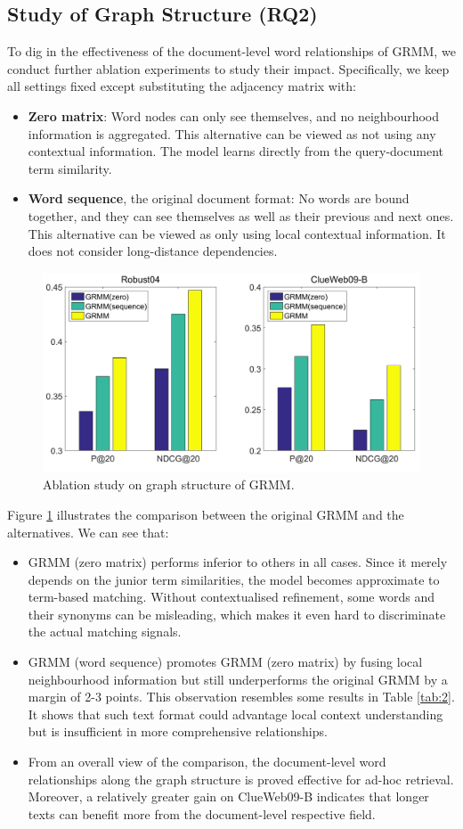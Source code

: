 \subsection{Study of Graph Structure (RQ2)}
\label{sec:graphstructure}
To dig in the effectiveness of the document-level word relationships of GRMM, we conduct further ablation experiments to study their impact. Specifically, we keep all settings fixed except substituting the adjacency matrix with: 
\begin{itemize}
	\item \textbf{Zero matrix}: Word nodes can only see themselves, and no neighbourhood information is aggregated. This alternative can be viewed as not using any contextual information. The model learns directly from the query-document term similarity.
	\item \textbf{Word sequence}, the original document format: No words are bound together, and they can see themselves as well as their previous and next ones. This alternative can be viewed as only using local contextual information. It does not consider long-distance dependencies. 
\end{itemize}


\begin{figure}[h]
	\centering
	\includegraphics[width=.47\textwidth]{./pics/graph_ablation.png}
	\caption{Ablation study on graph structure of GRMM.}
	\label{fig:3} 
\end{figure}

Figure \ref{fig:3} illustrates the comparison between the original GRMM and the alternatives. We can see that:
\begin{itemize}
    \item GRMM (zero matrix) performs inferior to others in all cases. Since it merely depends on the junior term similarities, the model becomes approximate to term-based matching. Without contextualised refinement, some words and their synonyms can be misleading, which makes it even hard to discriminate the actual matching signals. 
    \item GRMM (word sequence) promotes GRMM (zero matrix) by fusing local neighbourhood information but still underperforms the original GRMM by a margin of 2-3 points. This observation resembles some results in Table \ref{tab:2}. It shows that such text format could advantage local context understanding but is insufficient in more comprehensive relationships. 
    \item  From an overall view of the comparison, the document-level word relationships along the graph structure is proved effective for ad-hoc retrieval. Moreover, a relatively greater gain on ClueWeb09-B indicates that longer texts can benefit more from the document-level respective field.
\end{itemize}

